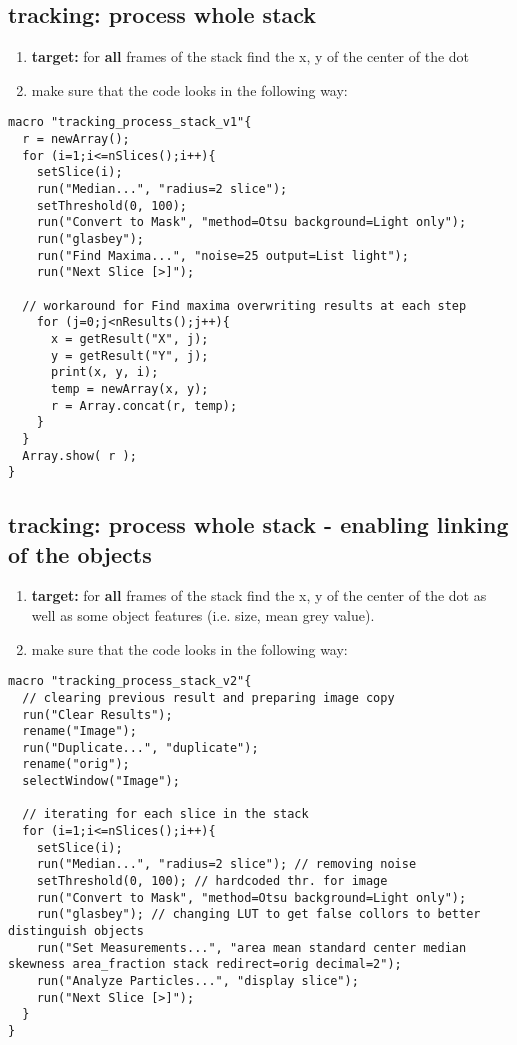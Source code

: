 \documentclass[11pt]{article}
\begin{document}
\subsection{tracking: process whole stack}
\label{sec-8-3}
\begin{enumerate}
\item \textbf{target:} for \textbf{all} frames of the stack find the x, y of the
center of the dot
\item make sure that the code looks in the following way:
\end{enumerate}
\begin{verbatim}
macro "tracking_process_stack_v1"{
  r = newArray();
  for (i=1;i<=nSlices();i++){
	setSlice(i);
	run("Median...", "radius=2 slice");
	setThreshold(0, 100);
	run("Convert to Mask", "method=Otsu background=Light only");
	run("glasbey");
	run("Find Maxima...", "noise=25 output=List light");
	run("Next Slice [>]");

  // workaround for Find maxima overwriting results at each step
	for (j=0;j<nResults();j++){
	  x = getResult("X", j);
	  y = getResult("Y", j);
	  print(x, y, i);
	  temp = newArray(x, y);
	  r = Array.concat(r, temp);
	}
  }
  Array.show( r );
}
\end{verbatim}

\subsection{tracking: process whole stack - enabling linking of the objects}
\label{sec-8-4}
\begin{enumerate}
\item \textbf{target:} for \textbf{all} frames of the stack find the x, y of the
center of the dot as well as some object features (i.e. size,
mean grey value).
\item make sure that the code looks in the following way:
\end{enumerate}
\begin{verbatim}
macro "tracking_process_stack_v2"{
  // clearing previous result and preparing image copy
  run("Clear Results"); 
  rename("Image");
  run("Duplicate...", "duplicate");
  rename("orig");
  selectWindow("Image");

  // iterating for each slice in the stack
  for (i=1;i<=nSlices();i++){
	setSlice(i);
	run("Median...", "radius=2 slice"); // removing noise
	setThreshold(0, 100); // hardcoded thr. for image
	run("Convert to Mask", "method=Otsu background=Light only");
	run("glasbey"); // changing LUT to get false collors to better distinguish objects
	run("Set Measurements...", "area mean standard center median skewness area_fraction stack redirect=orig decimal=2");
	run("Analyze Particles...", "display slice");
	run("Next Slice [>]");
  }
}
\end{verbatim}
\end{document}
